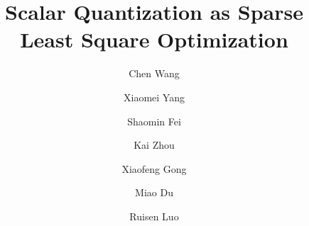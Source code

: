\documentclass[preprint,10pt]{elsarticle}
\date{}
\begin{document}
\begin{frontmatter}
\title{Scalar Quantization as Sparse Least Square Optimization}


\author[add1,add2]{Chen Wang}
\author[add1]{Xiaomei Yang}
\author[add3]{Shaomin Fei}
\author[add1]{Kai Zhou}
\author[add1]{Xiaofeng Gong}
\author[add1]{Miao Du}
\author[add1]{Ruisen Luo}
\address[add1]{College of Electrical Engineering, Sichuan University, Chengdu, Sichuan 610065, China}
\address[add2]{Department of Computer Science, Rutgers University -- New Brunswick, Piscataway, New Jersey 08854, USA}
\address[add3]{Engineering Practice Center, Chengdu University of Information Technology, Chengdu, Sichuan 610059, China}


\end{frontmatter}
\end{document}

